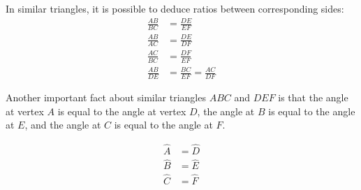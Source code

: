 In similar triangles, it is possible to deduce ratios between corresponding sides:
\begin{align*}
  \frac{AB}{BC} &= \frac{DE}{EF} \\
  \frac{AB}{AC} &= \frac{DE}{DF} \\
  \frac{AC}{BC} &= \frac{DF}{EF} \\
  \frac{AB}{DE} &= \frac{BC}{EF} = \frac{AC}{DF}
\end{align*}

Another important fact about similar triangles $ABC$ and $DEF$ is that
the angle at vertex $A$ is equal to the angle at vertex $D$, the angle
at $B$ is equal to the angle at $E$, and the angle at $C$ is equal to
the angle at $F$.\par


\begin{align*}
  \hat A &= \hat D \\
  \hat B &= \hat E \\
  \hat C &= \hat F
\end{align*}

